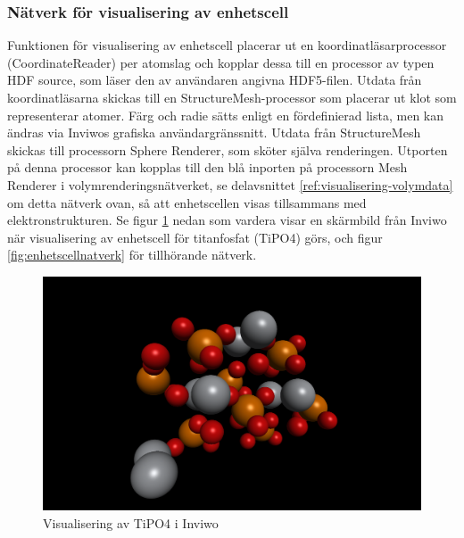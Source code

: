 \documentclass[a4paper,12pt]{article}
\begin{document}
\subsubsection{Nätverk för visualisering av enhetscell} 
Funktionen för visualisering av enhetscell
placerar ut en koordinatläsarprocessor (CoordinateReader) per atomslag och kopplar dessa till en processor av typen HDF source, som läser den av användaren angivna HDF5-filen. Utdata från koordinatläsarna skickas till en StructureMesh-processor som placerar ut klot som representerar atomer. Färg och radie sätts enligt en fördefinierad lista, men kan ändras via Inviwos grafiska användargränssnitt. Utdata från 
StructureMesh skickas till processorn Sphere Renderer,
som sköter själva renderingen. 
Utporten på denna processor kan kopplas till den blå inporten på processorn Mesh Renderer i 
volymrenderingsnätverket, se delavsnittet \ref{ref:visualisering-volymdata} om detta nätverk ovan, 
så att enhetscellen visas tillsammans 
med elektronstrukturen. Se figur \ref{fig:enhetscell}
nedan som vardera visar en skärmbild från Inviwo när 
visualisering av enhetscell 
för titanfosfat (TiPO4) görs, och figur \ref{fig:enhetscellnatverk} för tillhörande nätverk.

\begin{figure}[H]
    \centering
    \includegraphics[scale=0.25]{screenshot_enhetscell_TiPO4.png}
    \caption{Visualisering av TiPO4 i Inviwo}
    \label{fig:enhetscell}
\end{figure}
\end{document}
